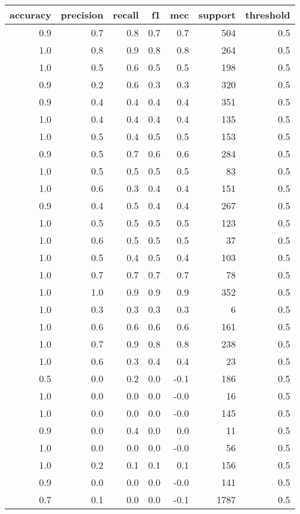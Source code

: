 \begin{tabular}{rrrrrrr}
\toprule
accuracy & precision & recall & f1 & mcc & support & threshold \\
\midrule
0.9 & 0.7 & 0.8 & 0.7 & 0.7 & 504 & 0.5 \\
1.0 & 0.8 & 0.9 & 0.8 & 0.8 & 264 & 0.5 \\
1.0 & 0.5 & 0.6 & 0.5 & 0.5 & 198 & 0.5 \\
0.9 & 0.2 & 0.6 & 0.3 & 0.3 & 320 & 0.5 \\
0.9 & 0.4 & 0.4 & 0.4 & 0.4 & 351 & 0.5 \\
1.0 & 0.4 & 0.4 & 0.4 & 0.4 & 135 & 0.5 \\
1.0 & 0.5 & 0.4 & 0.5 & 0.5 & 153 & 0.5 \\
0.9 & 0.5 & 0.7 & 0.6 & 0.6 & 284 & 0.5 \\
1.0 & 0.5 & 0.5 & 0.5 & 0.5 & 83 & 0.5 \\
1.0 & 0.6 & 0.3 & 0.4 & 0.4 & 151 & 0.5 \\
0.9 & 0.4 & 0.5 & 0.4 & 0.4 & 267 & 0.5 \\
1.0 & 0.5 & 0.5 & 0.5 & 0.5 & 123 & 0.5 \\
1.0 & 0.6 & 0.5 & 0.5 & 0.5 & 37 & 0.5 \\
1.0 & 0.5 & 0.4 & 0.5 & 0.4 & 103 & 0.5 \\
1.0 & 0.7 & 0.7 & 0.7 & 0.7 & 78 & 0.5 \\
1.0 & 1.0 & 0.9 & 0.9 & 0.9 & 352 & 0.5 \\
1.0 & 0.3 & 0.3 & 0.3 & 0.3 & 6 & 0.5 \\
1.0 & 0.6 & 0.6 & 0.6 & 0.6 & 161 & 0.5 \\
1.0 & 0.7 & 0.9 & 0.8 & 0.8 & 238 & 0.5 \\
1.0 & 0.6 & 0.3 & 0.4 & 0.4 & 23 & 0.5 \\
0.5 & 0.0 & 0.2 & 0.0 & -0.1 & 186 & 0.5 \\
1.0 & 0.0 & 0.0 & 0.0 & -0.0 & 16 & 0.5 \\
1.0 & 0.0 & 0.0 & 0.0 & -0.0 & 145 & 0.5 \\
0.9 & 0.0 & 0.4 & 0.0 & 0.0 & 11 & 0.5 \\
1.0 & 0.0 & 0.0 & 0.0 & -0.0 & 56 & 0.5 \\
1.0 & 0.2 & 0.1 & 0.1 & 0.1 & 156 & 0.5 \\
0.9 & 0.0 & 0.0 & 0.0 & -0.0 & 141 & 0.5 \\
0.7 & 0.1 & 0.0 & 0.0 & -0.1 & 1787 & 0.5 \\
\bottomrule
\end{tabular}
